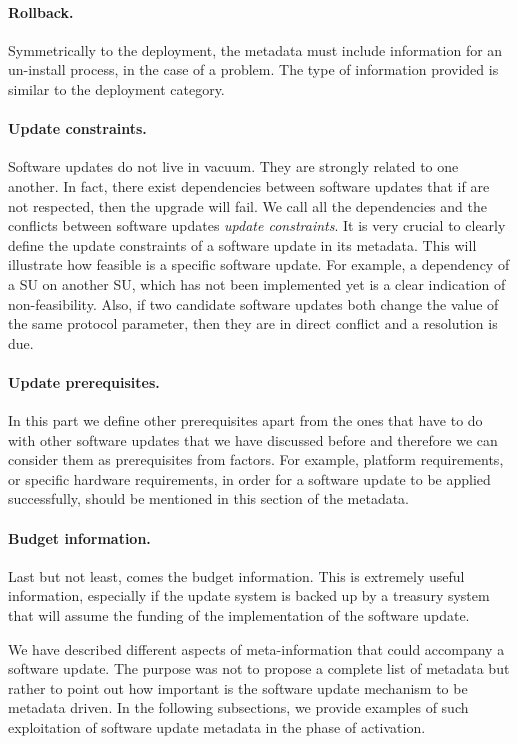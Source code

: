 \paragraph{Rollback.} Symmetrically to the deployment, the metadata must include information for an un-install process, in the case of a problem. The type of information provided is similar to the deployment category.
\paragraph{Update constraints.} Software updates do not live in vacuum. They are strongly related to one another. In fact, there exist dependencies between software updates that if are not respected, then the upgrade will fail. We call all the dependencies and the conflicts between software updates \emph{update constraints}. It is very crucial to clearly define the update constraints of a software update in its metadata. This will illustrate how feasible is a specific software update. For example, a dependency of a SU on another SU, which has not been implemented yet is a clear indication of non-feasibility. Also, if two candidate software updates both change the value of the same protocol parameter, then they are in direct conflict and a resolution is due.
\paragraph{Update prerequisites.} In this part we define other prerequisites apart from the ones that have to do with other software updates that we have discussed before and therefore we can consider them as prerequisites from  factors. For example, platform requirements, or specific hardware requirements, in order for a software update to be applied successfully, should be mentioned in this section of the metadata.
\paragraph{Budget information.} Last but not least, comes the budget information. This is extremely useful information, especially if the update system is backed up by a treasury system \cite{treasury} that will assume the funding of the implementation of the software update.

We have described different aspects of meta-information that could accompany a software update. The purpose was not to propose a complete list of metadata but rather to point out how important is the software update mechanism to be metadata driven. In the following subsections, we provide examples of such exploitation of software update metadata in the phase of activation.


